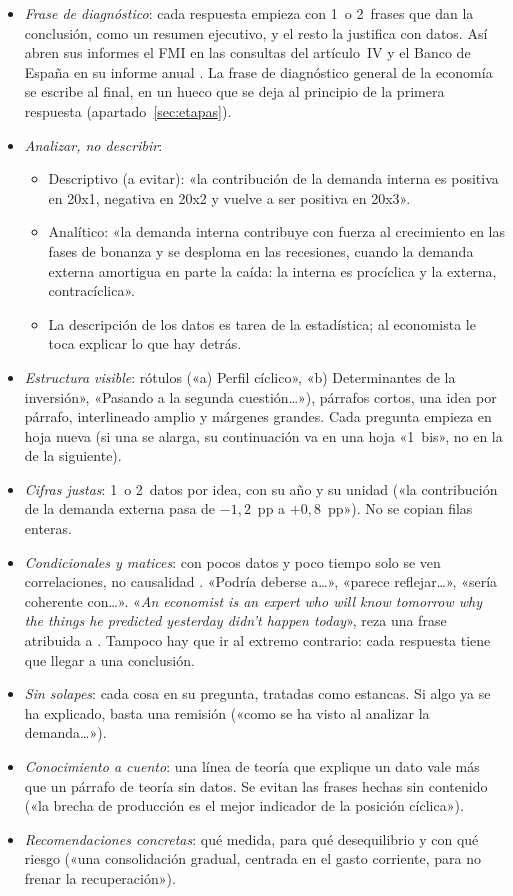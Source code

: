 \documentclass[11pt]{article}
\begin{document}
\begin{itemize}
\item \emph{Frase de diagnóstico}: cada respuesta empieza con 1~o 2~frases que dan la conclusión, como un resumen ejecutivo, y el resto la justifica con datos. Así abren sus informes el FMI en las consultas del artículo~IV y el Banco de España en su informe anual \parencite{FMI2026ArticuloIV,BdE2026InformeAnual}. La frase de diagnóstico general de la economía se escribe al final, en un hueco que se deja al principio de la primera respuesta (apartado~\ref{sec:etapas}).
\item \emph{Analizar, no describir}:
  \begin{itemize}
  \item Descriptivo (a evitar): «la contribución de la demanda interna es positiva en 20x1, negativa en 20x2 y vuelve a ser positiva en 20x3».
  \item Analítico: «la demanda interna contribuye con fuerza al crecimiento en las fases de bonanza y se desploma en las recesiones, cuando la demanda externa amortigua en parte la caída: la interna es procíclica y la externa, contracíclica».
  \item La descripción de los datos es tarea de la estadística; al economista le toca explicar lo que hay detrás.
  \end{itemize}
\item \emph{Estructura visible}: rótulos («a) Perfil cíclico», «b) Determinantes de la inversión», «Pasando a la segunda cuestión…»), párrafos cortos, una idea por párrafo, interlineado amplio y márgenes grandes. Cada pregunta empieza en hoja nueva (si una se alarga, su continuación va en una hoja «1~bis», no en la de la siguiente).
\item \emph{Cifras justas}: 1~o 2~datos por idea, con su año y su unidad («la contribución de la demanda externa pasa de $-1{,}2$~pp a $+0{,}8$~pp»). No se copian filas enteras.
\item \emph{Condicionales y matices}: con pocos datos y poco tiempo solo se ven correlaciones, no causalidad . «Podría deberse a…», «parece reflejar…», «sería coherente con…». «\emph{An economist is an expert who will know tomorrow why the things he predicted yesterday didn't happen today}», reza una frase atribuida a  \parencite{Peter1977}. Tampoco hay que ir al extremo contrario: cada respuesta tiene que llegar a una conclusión.
\item \emph{Sin solapes}: cada cosa en su pregunta, tratadas como estancas. Si algo ya se ha explicado, basta una remisión («como se ha visto al analizar la demanda…»).
\item \emph{Conocimiento a cuento}: una línea de teoría que explique un dato vale más que un párrafo de teoría sin datos. Se evitan las frases hechas sin contenido («la brecha de producción es el mejor indicador de la posición cíclica»).
\item \emph{Recomendaciones concretas}: qué medida, para qué desequilibrio y con qué riesgo («una consolidación gradual, centrada en el gasto corriente, para no frenar la recuperación»).
\end{itemize}
\end{document}
